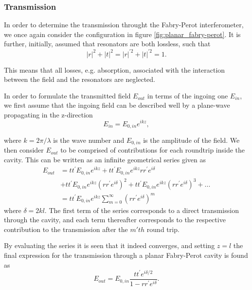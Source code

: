 \subsubsection{Transmission}

In order to determine the transmission throught the Fabry-Perot interferometer, we once again consider the configuration in figure \ref{fig:planar_fabry-perot}. It is further, initially, assumed that resonators are both lossless, such that
\begin{equation}
    |r|^2 + |t|^2 = |r|^{\prime 2} + |t|^{\prime 2} = 1.
    \label{eq:lossless_condition}
\end{equation}

This means that all losses, e.g. absorption, associated with the interaction between the field and the resonators are neglected. 

In order to formulate the transmitted field $E_{out}$ in terms of the ingoing one $E_{in}$, we first assume that the ingoing field can be described well by a plane-wave propagating in the z-direction
\begin{equation}
    E_{in} = E_{0,in} e^{ikz},
\end{equation}

where $k = 2 \pi / \lambda$ is the wave number and $E_{0,in}$ is the amplitude of the field. We then consider $E_{out}$ to be comprised of contributions for each roundtrip inside the cavity. This can be written as an infinite geometrical series given as
\begin{equation}
    \begin{split}
        E_{out} & = tt^{\prime} E_{0,in} e^{ikz} + tt^{\prime} E_{0,in} e^{ikz} rr^{\prime} e^{i\delta}\\&+ tt^{\prime} E_{0,in} e^{ikz} \left(rr^{\prime} e^{i\delta}\right)^2 + tt^{\prime} E_{0,in} e^{ikz} \left(rr^{\prime} e^{i\delta}\right)^3 + ...\\& = tt^{\prime} E_{0,in} e^{ikz} \sum^{\infty}_{m=0}\left( rr^{\prime}e^{i\delta} \right)^m
    \end{split}
    \label{eq:transmission_as_geometric_series}
\end{equation}
where $\delta = 2kl$. The first term of the series corresponds to a direct transmission through the cavity, and each term thereafter corresponds to the respective contribution to the transmission after the $m'th$ round trip. 

By evaluating the series it is seen that it indeed converges, and setting $z=l$ the final expression for the transmission through a planar Fabry-Perot cavity is found as
\begin{equation}
    E_{out} = E_{0,in}\frac{tt^{\prime} e^{i\delta /2}}{1 - rr^{\prime} e^{i\delta}}.
    \label{eq:fabry_perot_trans}
\end{equation}

